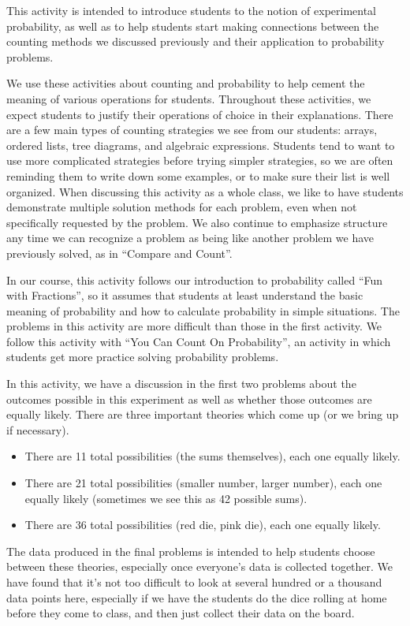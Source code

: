 \documentclass{ximera}
\begin{document}
\newpage
\begin{instructorNotes}
This activity is intended to introduce students to the notion of experimental probability, as well as to help students start making connections between the counting methods we discussed previously and their application to probability problems.

We use these activities about counting and probability to help cement the meaning of various operations for students.  Throughout these activities, we expect students to justify their operations of choice in their explanations.  There are a few main types of counting strategies we see from our students: arrays, ordered lists, tree diagrams, and algebraic expressions.  Students tend to want to use more complicated strategies before trying simpler strategies, so we are often reminding them to write down some examples, or to make sure their list is well organized. When discussing this activity as a whole class, we like to have students demonstrate multiple solution methods for each problem, even when not specifically requested by the problem.  We also continue to emphasize structure any time we can recognize a problem as being like another problem we have previously solved, as in ``Compare and Count''.

In our course, this activity follows our introduction to probability called ``Fun with Fractions'', so it assumes that students at least understand the basic meaning of probability and how to calculate probability in simple situations.  The problems in this activity are more difficult than those in the first activity.  We follow this activity with ``You Can Count On Probability'', an activity in which students get more practice solving probability problems.

In this activity, we have a discussion in the first two problems about the outcomes possible in this experiment as well as whether those outcomes are equally likely.  There are three important theories which come up (or we bring up if necessary).
\begin{itemize}
	\item There are 11 total possibilities (the sums themselves), each one equally likely.
	\item There are 21 total possibilities (smaller number, larger number), each one equally likely (sometimes we see this as 42 possible sums).
	\item There are 36 total possibilities (red die, pink die), each one equally likely.
\end{itemize}
The data produced in the final problems is intended to help students choose between these theories, especially once everyone's data is collected together.  We have found that it's not too difficult to look at several hundred or a thousand data points here, especially if we have the students do the dice rolling at home before they come to class, and then just collect their data on the board.


\end{instructorNotes}
\end{document}
